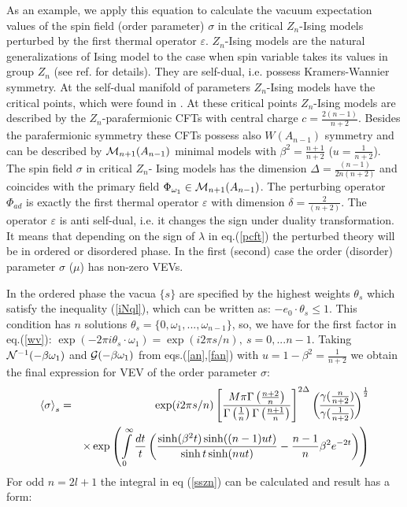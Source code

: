 \documentclass[a4paper,12pt]{article}
\begin{document}
As an example, we apply this equation to 
calculate the vacuum expectation values of
the spin field (order parameter) $\sigma $ in the critical $Z_n$-Ising models 
perturbed by the first thermal operator 
$\varepsilon$. $Z_n$-Ising models are the natural generalizations of Ising model to the case when spin variable takes its values 
in group $Z_n$ (see ref. \cite{VFAZ} for details). They are 
self-dual, i.e. possess Kramers-Wannier symmetry. At the self-dual manifold of
parameters $Z_n$-Ising models have the critical points, which were found in
\cite{VFAZ}. At these critical points   
$Z_n$-Ising models are described by the 
$Z_n$-parafermionic CFTs with central charge 
$c=\frac{2(n-1)}{n+2}$.
Besides the parafermionic symmetry these CFTs possess also $W(A_{n-1})$
symmetry and can be described by ${\cal M}_{n+1}(A_{n-1})$ minimal models
with $\beta ^2=\frac{n+1}{n+2}$ ($u=\frac 1{n+2}$). The spin field $\sigma $
in critical $Z_n$- Ising models has the dimension 
$\Delta =\frac{(n-1)}{2n(n+2)}$ and coincides with the primary field 
$\Phi _{\omega _1}\in {\cal M}_{n+1}(A_{n-1})$. 
The perturbing operator $\Phi _{ad}$ is exactly the
first thermal operator $\varepsilon $ with dimension 
$\delta =\frac 2{(n+2)}$. The operator $\varepsilon $ is anti self-dual, i.e. it changes the sign under duality transformation. It means that depending 
on the sign of $\lambda$ in eq.(\ref{pcft}) the perturbed theory will be in 
ordered or disordered phase. In the first (second) case the order (disorder) 
parameter $\sigma$ ($\mu$) has non-zero VEVs.

In the ordered phase the vacua $\{s\}$ 
are specified by the highest
weights $\theta _s$ which satisfy the inequality (\ref{iNql}), 
which can be written as:
 $-e_0\cdot \theta _s\leq1$. 
This condition has $n$ solutions $\theta _s=\{0,\omega _1,...,\omega
_{n-1}\}$, so, we have for the first factor in eq.(\ref{wv}): 
$\exp (-2\pi i\theta _s\cdot \omega _1)=
\exp (i2\pi s/n),\ s=0,...n-1.$ Taking ${\cal N}^{-1}(-\beta \omega _1)$ and 
${\cal G}(-\beta \omega _1)$ from eqs.(\ref{an},\ref{fan}) with $u=1-\beta^2=
\frac 1{n+2}$ 
we obtain the final
expression for VEV of the order parameter $\sigma $:
\begin{eqnarray}
\left\langle \sigma \right\rangle _s &=
&\exp(i2\pi s/n)\left[ \frac{M\pi \Gamma
\left( \frac{n+2}n\right) }{\Gamma \left( \frac 1n\right) \Gamma \left( 
\frac{n+1}n\right) }\right] ^{2\Delta }
{\gamma (\frac n{n+2}) \overwithdelims() \gamma (\frac 1{n+2})}
^{\frac 12}
\nonumber \\
&&\times \exp \left( \int\limits_0^\infty \frac{dt}t
\left( \frac{\sinh (\beta^2t)
\sinh ((n-1)ut)}
{\sinh t\sinh (nut)}-\frac{n-1}{n}\beta^2e^{-2t}\right) \right)  
\label{sszn}
\end{eqnarray}
For odd $n=2l+1$ the
integral in eq (\ref{sszn}) can be calculated and result has a form:
\end{document}
